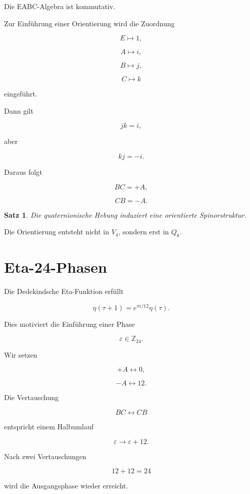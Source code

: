 \documentclass[11pt,a4paper]{article}
\newtheorem{satz}{Satz}[section]
\theoremstyle{definition}
\theoremstyle{remark}
\begin{document}
	Die EABC-Algebra ist kommutativ.
	
	Zur Einführung einer Orientierung wird die Zuordnung
	
	\[
	E\mapsto1,
	\]
	
	\[
	A\mapsto i,
	\]
	
	\[
	B\mapsto j,
	\]
	
	\[
	C\mapsto k
	\]
	
	eingeführt.
	
	Dann gilt
	
	\[
	jk=i,
	\]
	
	aber
	
	\[
	kj=-i.
	\]
	
	Daraus folgt
	
	\[
	BC=+A,
	\]
	
	\[
	CB=-A.
	\]
	
	\begin{satz}
		
		Die quaternionische Hebung induziert
		eine orientierte Spinorstruktur.
		
	\end{satz}
	
	Die Orientierung entsteht nicht in \(V_4\),
	sondern erst in \(Q_8\).
	
	
	\section{Eta-24-Phasen}
	
	Die Dedekindsche Eta-Funktion erfüllt
	
	\[
	\eta(\tau+1)
	=
	e^{\pi i/12}\eta(\tau).
	\]
	
	Dies motiviert die Einführung einer Phase
	
	\[
	\varepsilon
	\in
	\mathbb Z_{24}.
	\]
	
	Wir setzen
	
	\[
	+A
	\leftrightarrow
	0,
	\]
	
	\[
	-A
	\leftrightarrow
	12.
	\]
	
	Die Vertauschung
	
	\[
	BC
	\leftrightarrow
	CB
	\]
	
	entspricht einem Halbumlauf
	
	\[
	\varepsilon
	\rightarrow
	\varepsilon+12.
	\]
	
	Nach zwei Vertauschungen
	
	\[
	12+12=24
	\]
	
	wird die Ausgangsphase wieder erreicht.
	
\end{document}
